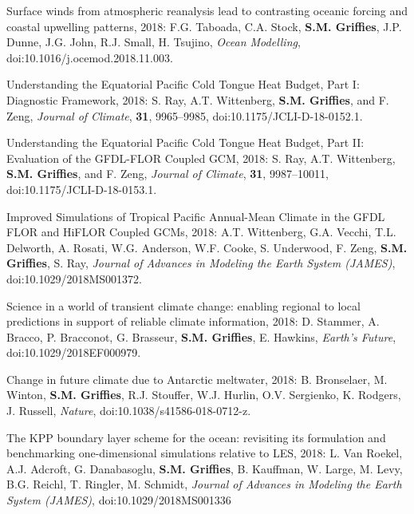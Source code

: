 \begin{etaremune}

\item Surface winds from atmospheric reanalysis lead to contrasting oceanic forcing and coastal upwelling patterns, 2018: F.G. Taboada, C.A. Stock, {\bf S.M. Grif\/f\/ies}, J.P. Dunne, J.G. John, R.J. Small, H. Tsujino, {\it Ocean Modelling},
\\ doi:10.1016/j.ocemod.2018.11.003.

\item Understanding the Equatorial Pacific Cold Tongue Heat Budget, Part I: Diagnostic Framework, 2018: S. Ray, A.T. Wittenberg, {\bf S.M. Griffies}, and F. Zeng, {\it Journal of Climate}, {\bf 31}, 9965--9985, doi:10.1175/JCLI-D-18-0152.1. 

\item Understanding the Equatorial Pacific Cold Tongue Heat Budget, Part II: Evaluation of the GFDL-FLOR Coupled GCM, 2018: S. Ray, A.T. Wittenberg, {\bf S.M. Griffies}, and F. Zeng, {\it Journal of Climate}, {\bf 31}, 9987--10011, doi:10.1175/JCLI-D-18-0153.1.

\item Improved Simulations of Tropical Pacific Annual-Mean Climate in the GFDL FLOR and HiFLOR Coupled GCMs, 2018:  A.T. Wittenberg, G.A. Vecchi, T.L. Delworth, A. Rosati, W.G. Anderson, W.F. Cooke, S. Underwood, F. Zeng, {\bf S.M. Grif\/f\/ies}, S. Ray, {\it Journal of Advances in Modeling the Earth System (JAMES)}, doi:10.1029/2018MS001372. 


\item Science in a world of transient climate change: enabling regional to local predictions in support of reliable climate information, 2018: D. Stammer, A. Bracco, P. Bracconot, G. Brasseur, {\bf S.M. Grif\/f\/ies}, E. Hawkins, {\it Earth's Future}, \\ doi:10.1029/2018EF000979.

\item Change in future climate due to Antarctic meltwater, 2018: B. Bronselaer, M. Winton, {\bf S.M. Grif\/f\/ies}, R.J. Stouffer, W.J. Hurlin, O.V. Sergienko, K. Rodgers, J. Russell, {\it  Nature}, doi:10.1038/s41586-018-0712-z.

\item The KPP boundary layer scheme for the ocean: revisiting its formulation and benchmarking one-dimensional simulations relative to LES,  2018: L. Van Roekel, A.J.  Adcroft, G. Danabasoglu, {\bf S.M. Grif\/f\/ies}, B. Kauffman, W. Large, M. Levy, B.G. Reichl, T. Ringler, M. Schmidt, {\it Journal of Advances in Modeling the Earth System (JAMES)}, doi:10.1029/2018MS001336


\end{etaremune}
